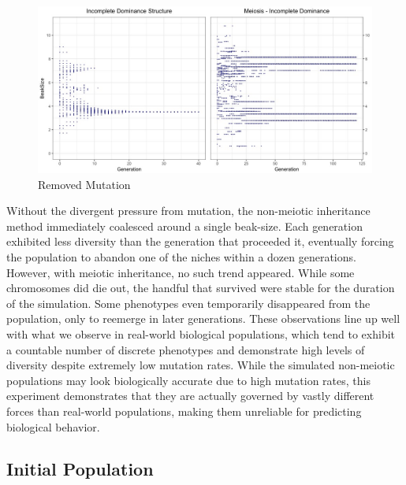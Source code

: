 \documentclass{article}
\begin{document}
\begin{figure}
    \centering
    \includegraphics[width=\linewidth]{Data/EXP4}
    \caption{Removed Mutation}
    \label{fig:EXP4}
\end{figure}

Without the divergent pressure from mutation, the non-meiotic inheritance method immediately coalesced around a single beak-size. Each generation exhibited less diversity than the generation that proceeded it, eventually forcing the population to abandon one of the niches within a dozen generations. However, with meiotic inheritance, no such trend appeared. While some chromosomes did die out, the handful that survived were stable for the duration of the simulation. Some phenotypes even temporarily disappeared from the population, only to reemerge in later generations. These observations line up well with what we observe in real-world biological populations, which tend to exhibit a countable number of discrete phenotypes and demonstrate high levels of diversity despite extremely low mutation rates. While the simulated non-meiotic populations may look biologically accurate due to high mutation rates, this experiment demonstrates that they are actually governed by vastly different forces than real-world populations, making them unreliable for predicting biological behavior. 

\subsection{Initial Population}
\end{document}
